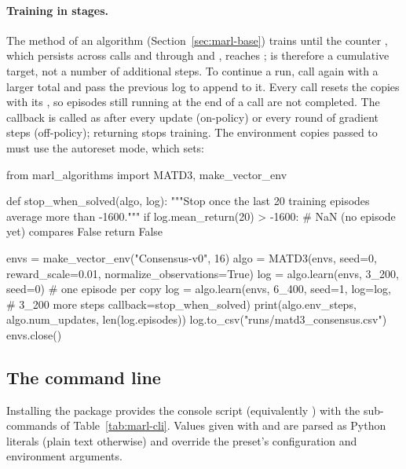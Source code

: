 \paragraph{Training in stages.} The method  of an algorithm
(Section~\ref{sec:marl-base}) trains until the counter , which
persists across calls and through  and , reaches
;  is therefore a cumulative target, not
a number of additional steps. To continue a run, call  again with
a larger total and pass the previous log to append to it. Every call resets
the copies with its , so episodes still running at the end of a
call are not completed. The callback is
called as  after every update (on-policy) or
every round of gradient steps (off-policy); returning  stops
training. The environment copies passed to  must use the
 autoreset mode, which  sets:

\begin{pycode}
from marl_algorithms import MATD3, make_vector_env

def stop_when_solved(algo, log):
    """Stop once the last 20 training episodes average more than -1600."""
    if log.mean_return(20) > -1600:     # NaN (no episode yet) compares False
        return False

envs = make_vector_env("Consensus-v0", 16)
algo = MATD3(envs, seed=0, reward_scale=0.01, normalize_observations=True)
log = algo.learn(envs, 3_200, seed=0)            # one episode per copy
log = algo.learn(envs, 6_400, seed=1, log=log,   # 3_200 more steps
                 callback=stop_when_solved)
print(algo.env_steps, algo.num_updates, len(log.episodes))
log.to_csv("runs/matd3_consensus.csv")
envs.close()
\end{pycode}

\subsection{The \texorpdfstring{}{marl-train} command line}\label{sec:marl-cli}

Installing the package provides the console script 
(equivalently ) with the sub-commands of
Table~\ref{tab:marl-cli}. Values given with  and
 are parsed as Python literals (plain text otherwise) and
override the preset's configuration and environment arguments.

